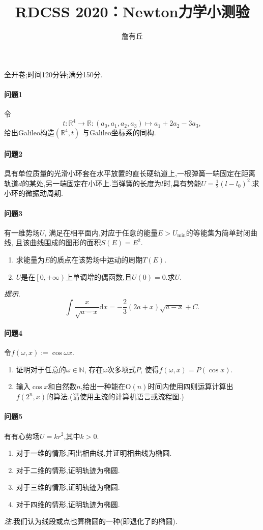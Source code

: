 \documentclass{article}
\title{RDCSS 2020：Newton力学小测验}
\author{詹有丘}
\begin{document}
\maketitle

全开卷;时间120分钟;满分150分.

\paragraph{问题1}
令
$$t:\mathbb R^4\to\mathbb R:\left(a_0,a_1,a_2,a_3\right)\mapsto a_1+2a_2-3a_3,$$
给出Galileo构造$\left(\mathbb R^4,t\right)$
与Galileo坐标系的同构.

\paragraph{问题2}
具有单位质量的光滑小环套在水平放置的直长硬轨道上,一根弹簧一端固定在距离轨道$d$的某处,另一端固定在小环上.当弹簧的长度为$l$时,具有势能$U=\frac12\left(l-l_0\right)^2$.求小环的微振动周期.

\paragraph{问题3}
有一维势场$U$,
满足在相平面内,对应于任意的能量$E>U_\mathrm{min}$的等能集为简单封闭曲线,
且该曲线围成的图形的面积$S\left(E\right)=E^2$.
\begin{enumerate}
	\item 求能量为$E$的质点在该势场中运动的周期$T\left(E\right)$.
	\item $U$是在$\left[0,+\infty\right)$上单调增的偶函数,且$U\left(0\right)=0$.求$U$.
\end{enumerate}
\textit{提示}.$$\int\frac x{\sqrt{a-x}}\mathrm dx=-\frac23\left(2a+x\right)\sqrt{a-x}+C.$$

\paragraph{问题4}
令$f\left(\omega,x\right):=\cos\omega x$.
\begin{enumerate}
	\item 证明对于任意的$\omega\in\mathbb N$,
	存在$\omega$次多项式$P$,
	使得$f\left(\omega,x\right)=P\left(\cos x\right)$.
	\item 输入$\cos x$和自然数$n$,给出一种能在$\mathrm O\left(n\right)$时间内使用四则运算计算出$f\left(2^n,x\right)$的算法.(请使用主流的计算机语言或流程图.)
\end{enumerate}

\paragraph{问题5}
有有心势场$U=kr^2$,其中$k>0$.
\begin{enumerate}
	\item 对于一维的情形,画出相曲线,并证明相曲线为椭圆.
	\item 对于二维的情形,证明轨迹为椭圆.
	\item 对于三维的情形,证明轨迹为椭圆.
	\item 对于四维的情形,证明轨迹为椭圆.
\end{enumerate}
\textit{注}.我们认为线段或点也算椭圆的一种(即退化了的椭圆).
\end{document}
